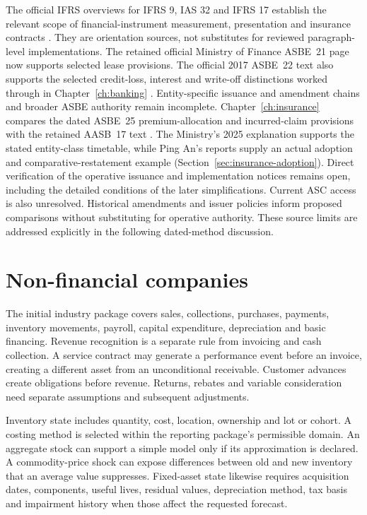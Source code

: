 The official IFRS overviews for IFRS 9, IAS 32 and IFRS 17 establish the relevant
scope of financial-instrument measurement, presentation and insurance
contracts \citep{ifrs9,ias32,ifrs17}. They are orientation sources, not substitutes
for reviewed paragraph-level implementations. The retained official Ministry of Finance ASBE~21 page now supports selected
lease provisions. The official 2017 ASBE~22 text also supports the selected
credit-loss, interest and write-off distinctions worked through in
Chapter~\ref{ch:banking} \citep{mofasbe22}. Entity-specific issuance and amendment
chains and broader ASBE authority remain incomplete. Chapter~\ref{ch:insurance}
compares the dated ASBE~25 premium-allocation and incurred-claim provisions
with the retained AASB~17 text \citep{mofasbe25}. The Ministry's 2025
explanation supports the stated entity-class timetable, while Ping An's
reports supply an actual adoption and comparative-restatement example
(Section~\ref{sec:insurance-adoption}). Direct verification of the operative
issuance and implementation notices remains open, including the detailed
conditions of the later simplifications. Current ASC access is also unresolved.
Historical amendments and issuer policies inform proposed comparisons without
substituting for operative authority. These source limits are addressed
explicitly in the following dated-method discussion.

\section{Non-financial companies}

The initial industry package covers sales, collections, purchases, payments,
inventory movements, payroll, capital expenditure, depreciation and basic
financing. Revenue recognition is a separate rule from invoicing and cash
collection. A service contract may generate a performance event before an
invoice, creating a different asset from an unconditional receivable. Customer
advances create obligations before revenue. Returns, rebates and variable
consideration need separate assumptions and subsequent adjustments.

Inventory state includes quantity, cost, location, ownership and lot or cohort.
A costing method is selected within the reporting package's permissible
domain. An aggregate stock can support a simple model only if its approximation
is declared. A commodity-price shock can expose differences between old and
new inventory that an average value suppresses. Fixed-asset state likewise
requires acquisition dates, components, useful lives, residual values,
depreciation method, tax basis and impairment history when those affect the
requested forecast.

